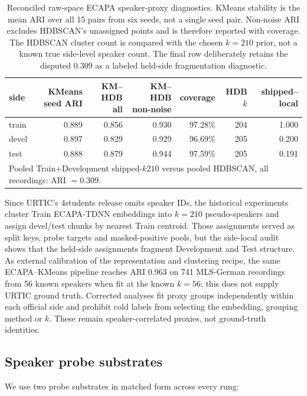 \begin{table}[t]
\centering\small
\caption{Reconciled raw-space ECAPA speaker-proxy diagnostics. KMeans stability
is the mean ARI over all 15 pairs from six seeds, not a single seed pair.
Non-noise ARI excludes HDBSCAN's unassigned points and is therefore reported
with coverage. The HDBSCAN cluster count is compared with the chosen $k=210$
prior, not a known true side-level speaker count. The final row deliberately
retains the disputed $0.309$ as a labeled held-side fragmentation diagnostic.}
\label{tab:ecapa_reconciliation}
\begin{tabular}{lrrrrrr}
\toprule
side & KMeans seed ARI & KM--HDB all & KM--HDB non-noise & coverage & HDB $k$ & shipped--local \\
\midrule
train & 0.889 & 0.856 & 0.930 & 97.28\% & 204 & 1.000 \\
devel & 0.897 & 0.829 & 0.929 & 96.69\% & 205 & 0.200 \\
test  & 0.888 & 0.879 & 0.944 & 97.59\% & 205 & 0.191 \\
\midrule
\multicolumn{7}{l}{Pooled Train+Development shipped-$k210$ versus pooled HDBSCAN, all recordings: ARI $=0.309$.} \\
\bottomrule
\end{tabular}
\end{table}

Since URTIC's 4students release omits speaker IDs, the historical experiments cluster Train ECAPA-TDNN embeddings into $k{=}210$ pseudo-speakers and assign devel/test chunks by nearest Train centroid. Those assignments served as split keys, probe targets and masked-positive pools, but the side-local audit shows that the held-side assignments fragment Development and Test structure. As external calibration of the representation and clustering recipe, the same ECAPA--KMeans pipeline reaches ARI $0.963$ on 741 MLS-German recordings from 56 known speakers when fit at the known $k=56$; this does not supply URTIC ground truth. Corrected analyses fit proxy groups independently within each official side and prohibit cold labels from selecting the embedding, grouping method or $k$. These remain speaker-correlated proxies, not ground-truth identities.

\subsection{Speaker probe substrates}
\label{ssec:probes}

We use two probe substrates in matched form across every rung:

